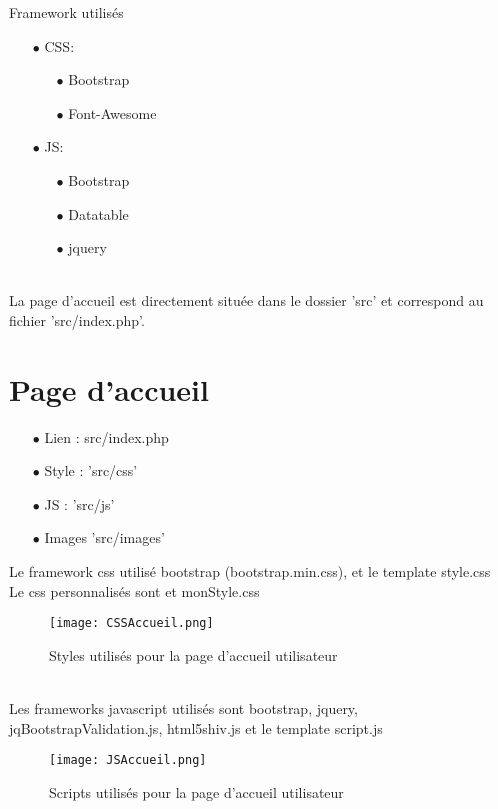 \documentclass{article}
\begin{document}
Framework utilisés
\begin{itemize}
\item[$\bullet$] CSS: \begin{itemize}
        \item[$\bullet$] Bootstrap
        \item[$\bullet$] Font-Awesome
    \end{itemize}
\item[$\bullet$] JS: \begin{itemize}
        \item[$\bullet$] Bootstrap
        \item[$\bullet$] Datatable
        \item[$\bullet$] jquery
    \end{itemize}
\end{itemize}\\
La page d'accueil est directement située dans le dossier 'src' et correspond au fichier 'src/index.php'.



\section{Page d'accueil}

\begin{itemize}
\item[$\bullet$] Lien : src/index.php
\item[$\bullet$] Style : 'src/css'
\item[$\bullet$] JS : 'src/js'
\item[$\bullet$] Images 'src/images'
\end{itemize}

Le framework css utilisé bootstrap (bootstrap.min.css), et le template style.css\\
Le css personnalisés sont et monStyle.css\\
\begin{figure}[h!]
\centering
\texttt{[image: CSSAccueil.png]}
\caption{Styles utilisés pour la page d'accueil utilisateur}
\end{figure}

\\
Les frameworks javascript utilisés sont bootstrap, jquery, jqBootstrapValidation.js, html5shiv.js
et le template script.js\\
\begin{figure}[h!]
\centering
\texttt{[image: JSAccueil.png]}
\caption{Scripts utilisés pour la page d'accueil utilisateur}
\end{figure}
\end{document}
